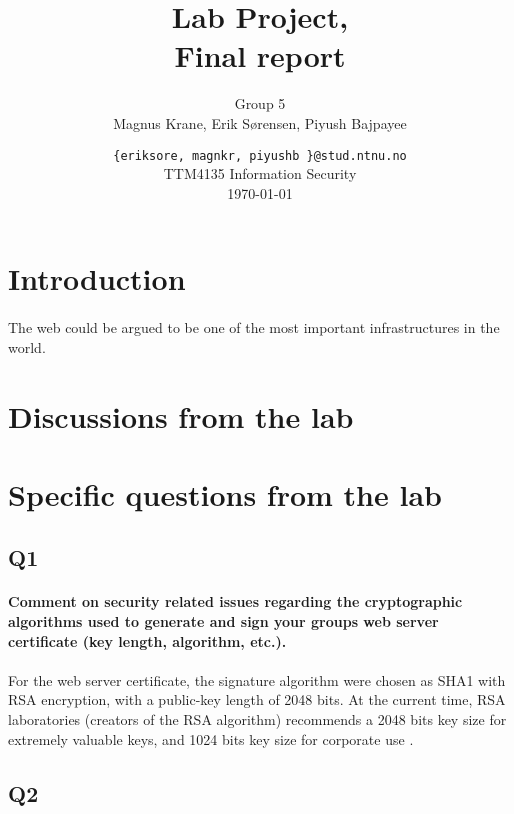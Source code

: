 \documentclass[a4paper,11pt]{article}
\title{Lab Project,\\Final report}
\author{Group 5 \\Magnus Krane, Erik S\o rensen, Piyush Bajpayee}
\date{ {\tt \{eriksore, magnkr, piyushb \}@stud.ntnu.no}\\
TTM4135 Information Security\\
\today}
\begin{document}
\maketitle
\vspace{3cm}

\begin{abstract}

\end{abstract}
\section*{Introduction}
\paragraph{}The web could be argued to be one of the most important infrastructures in the world.
\section{Discussions from the lab}
\paragraph{}
\section{Specific questions from the lab}
\subsection{Q1}
\paragraph{Comment on security related issues regarding the cryptographic algorithms used to
generate and sign your groups web server certiﬁcate (key length, algorithm, etc.).}
\paragraph{} For the web server certificate, the signature algorithm were chosen as SHA1 with RSA encryption, with a public-key length of 2048 bits. At the current time, RSA laboratories (creators of the RSA algorithm) recommends a 2048 bits key size for extremely valuable keys, and 1024 bits key size for corporate use \cite{2}.
\subsection{Q2}
\end{document}

